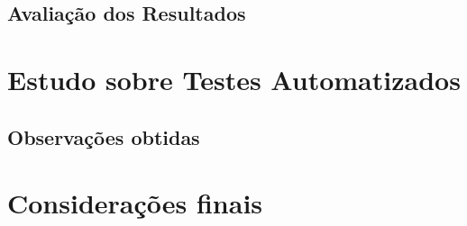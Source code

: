 \subsection{Avaliação dos Resultados}


\section {Estudo sobre Testes Automatizados}


\subsection{Observações obtidas}



\section{Considerações finais}







